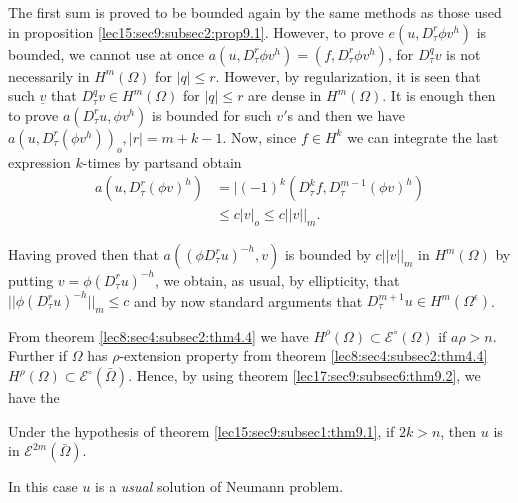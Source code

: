 The first sum is proved to be bounded again by the same methods as
those used in proposition \ref{lec15:sec9:subsec2:prop9.1}. However, to prove $e(u, D^r_\tau \phi v^h)$ is
bounded, we cannot use at once $a(u, D^r_\tau \phi v^h) = (f, D^r_\tau
\phi v^h)$, for $D^q_\tau v$ is not necessarily in $H^m (\Omega )$ for
$|q| \leq r$. However, by regularization, it is seen that such
$\underline{v}$ that $D^q_\tau v \in H^m (\Omega)$ for $|q|
\leq r$ are dense in $H^m (\Omega )$. It is enough then to prove
$a(D^r_\tau u, \phi v^h)$ is bounded for such $v'$s and then we have
$a(u, D^r_\tau (\phi v^h))_o, |r| = m+k-1$. Now, since $f \in
H^k$ we can integrate the last expression $k$-times by parts\pageoriginale and
obtain 
\begin{align*}
  a(u, D^r_\tau (\phi v)^h) & = | (-1)^k (D^k_\tau f, D^{m-1}_\tau (\phi v)^h)\\
  &\leq c| v |_o \leq c || v ||_m. 
\end{align*}

Having proved then that $a((\phi D^r_\tau u)^{-h}, v)$ is bounded by
$c || v ||_m$ in $H^m (\Omega )$ by putting $v = \phi (D^r_\tau
u)^{-h}$, we obtain, as usual, by ellipticity, that $|| \phi (D^r_\tau
u)^{-h} ||_m \leq c$ and by now standard arguments that $D^{m+1}_\tau
u \in H^m (\Omega^\epsilon )$.  

From theorem \ref{lec8:sec4:subsec2:thm4.4} we have $H^\rho (\Omega) \subset \mathscr{E}^\circ
(\Omega)$ if $a\rho > n$. Further if $\Omega$ has $\rho$-extension
property from theorem 
\ref{lec8:sec4:subsec2:thm4.4} $H^\rho (\Omega ) \subset \mathscr{E}^\circ (\bar{\Omega})$. Hence, by
using theorem \ref{lec17:sec9:subsec6:thm9.2}, we have the  
\begin{theorem}\label{lec17:sec9:subsec6:thm9.3}%
  Under the hypothesis of theorem \ref{lec15:sec9:subsec1:thm9.1}, if $2k > n$, then $u$ is in
  $\mathscr{E}^{2m} (\bar{\Omega})$.  
\end{theorem}

In this case $u$ is a \textit{usual} solution of Neumann problem. 

